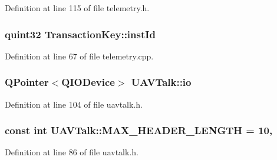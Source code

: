 Definition at line 115 of file telemetry.\-h.

\hypertarget{group___u_a_v_talk_plugin_ga3d92643b78ea3e10cd9ac1ac2cc4b5f7}{
\subsubsection[{inst\-Id}]{\setlength{\rightskip}{0pt plus 5cm}quint32 Transaction\-Key\-::inst\-Id}}\label{group___u_a_v_talk_plugin_ga3d92643b78ea3e10cd9ac1ac2cc4b5f7}


Definition at line 67 of file telemetry.\-cpp.

\hypertarget{group___u_a_v_talk_plugin_ga0047f38af98ba4de8e38500e10b73046}{
\subsubsection[{io}]{\setlength{\rightskip}{0pt plus 5cm}Q\-Pointer$<$Q\-I\-O\-Device$>$ U\-A\-V\-Talk\-::io\hspace{0.3cm}{\ttfamily [protected]}}}\label{group___u_a_v_talk_plugin_ga0047f38af98ba4de8e38500e10b73046}


Definition at line 104 of file uavtalk.\-h.

\hypertarget{group___u_a_v_talk_plugin_ga279763a8abdcb2fae7cb36916b36c1a8}{
\subsubsection[{M\-A\-X\-\_\-\-H\-E\-A\-D\-E\-R\-\_\-\-L\-E\-N\-G\-T\-H}]{\setlength{\rightskip}{0pt plus 5cm}const {\bf int} U\-A\-V\-Talk\-::\-M\-A\-X\-\_\-\-H\-E\-A\-D\-E\-R\-\_\-\-L\-E\-N\-G\-T\-H = 10\hspace{0.3cm}{\ttfamily [static]}, {\ttfamily [protected]}}}\label{group___u_a_v_talk_plugin_ga279763a8abdcb2fae7cb36916b36c1a8}


Definition at line 86 of file uavtalk.\-h.

